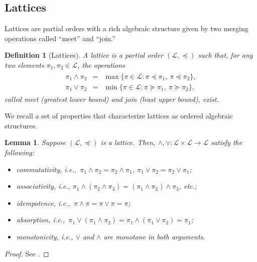 \documentclass[conference]{ieeeconf}
\renewcommand{\preceq}{\preccurlyeq}
\renewcommand{\succeq}{\succcurlyeq}
\newcommand{\lattice}{\mathcal{L}}
\newcommand{\join}{\vee}
\newcommand{\meet}{\wedge}
\newtheorem{lemma}{Lemma}
\newtheorem{definition}{Definition}
\begin{document}
\vspace{-0.25em}
\subsection{Lattices}
\vspace{-0.25em}

Lattices are partial orders with a rich algebraic structure given by two merging operations called ``meet'' and ``join.''
 
\begin{definition}[Lattices] \label{def:lattice}
    A \emph{lattice} is a partial order $(\lattice, \preceq)$ such that, for any two elements $\pi_1, \pi_2 \in \lattice$, the operations
    \begin{align*}
        \begin{aligned}
        \pi_1 \meet \pi_2 &=& \max\{ \pi \in \lattice: \pi \preceq \pi_1,~\pi \preceq \pi_2 \}, \\
        \pi_1 \join \pi_2 &=& \min\{ \pi \in \lattice: \pi \succeq \pi_1,~\pi \succeq \pi_2 \},       
        \end{aligned}
    \end{align*}
    called \emph{meet} (greatest lower bound) and \emph{join} (least upper bound), exist. 
\end{definition}

We recall a set of properties that characterize lattices as ordered algebraic structures.

\begin{lemma} \label{lem:lattice-axiom} 
    Suppose $(\lattice,\preceq)$ is a lattice. Then, $\meet, \join: \lattice \times \lattice \to \lattice$ satisfy the following:
    \begin{itemize}
        \item[(i)] \emph{commutativity}, i.e.,~$\pi_1 \meet \pi_2 = \pi_2 \meet \pi_1$, $\pi_1 \join \pi_2 = \pi_2 \join \pi_1$;
        \item[(ii)] \emph{associativity}, i.e., {\small $\pi_1 \meet (\pi_2 \meet \pi_3) = (\pi_1 \meet \pi_2) \meet \pi_3$}, etc.;
        \item[(iii)] \emph{idempotence}, i.e.,~$\pi \meet \pi = \pi \join \pi =  \pi$;
        \item[(iv)] \emph{absorption}, i.e.,~$\pi_1 \join \left( \pi_1 \meet \pi_2 \right) = \pi_1 \meet \left( \pi_1 \join \pi_2 \right) = \pi_1$;
        \item[(v)] \emph{monotonicity}, i.e., $\join$ and $\meet$ are monotone in both arguments.
    \end{itemize}
\end{lemma}
\begin{proof}
    See \cite[\S I.5 Lemma 1, \S I.5 Lemma 3]{birkhoff1940}.
\end{proof}
\end{document}
